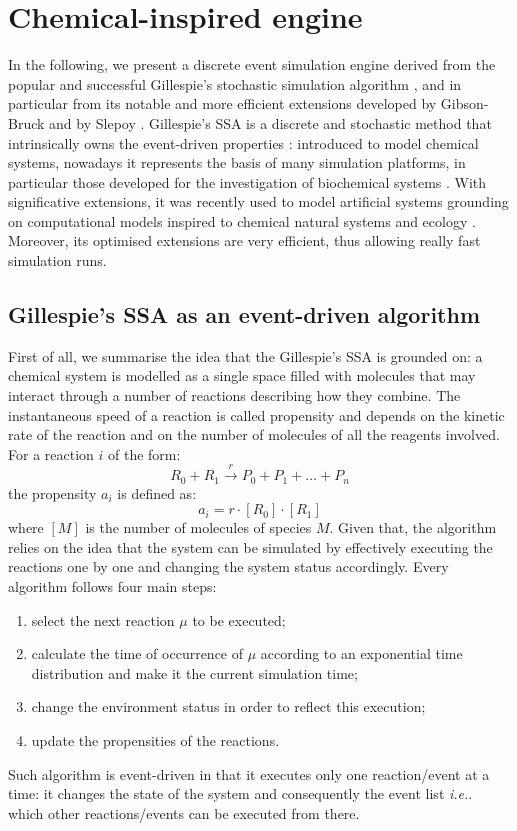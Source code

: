 \documentclass[12pt,a4paper,twoside,openright]{book}
\begin{document}
\chapter{Chemical-inspired engine}
\label{chemical-engine}
In the following, we present a discrete event simulation engine derived from the popular and successful Gillespie's stochastic simulation algorithm \cite{gillespie1977}, and in particular from its notable and more efficient extensions developed by Gibson-Bruck \cite{gibson2000} and by Slepoy \cite{slepoy2008}.   
%
Gillespie's SSA is a discrete and stochastic method that intrinsically owns the event-driven properties \cite{spatialeventgillespie}: introduced to model chemical systems, nowadays it represents the basis of many simulation platforms, in particular those developed for the investigation of biochemical systems \cite{Priami:2001,Kierzek01032002,CiocchettaH09,versari08,montagna-cs2bio10,btssoc-jos7,Hoops15122006}. 
%
With significative extensions, it was recently used to model artificial systems grounding on computational models inspired to chemical natural systems and ecology \cite{Montagna-MONET2012}.
%
Moreover, its optimised extensions \cite{gibson2000,slepoy2008} are very efficient, thus allowing really fast simulation runs.

\section{Gillespie's SSA as an event-driven algorithm}
First of all, we summarise the idea that the Gillespie's SSA is grounded on:
%
a chemical system is modelled as a single space filled with molecules that may interact through a number of reactions describing how they combine. 
%
The instantaneous speed of a reaction is called propensity and depends on the kinetic  rate of the reaction and on the number of molecules of all the reagents involved. 
%
For a reaction $i$ of the form:
$$ R_0 + R_1 \xrightarrow{r} P_0 + P_1 + \ldots + P_n$$
the propensity $a_i$ is defined as:
$$ a_i = r\cdot [R_0] \cdot [R_1] $$
where $[M]$ is the number of molecules of species $M$.
%
Given that, the algorithm relies on the idea that the system can be simulated by effectively executing the reactions one by one and changing the system status accordingly. 
%
Every algorithm follows four main steps:
%
\begin{enumerate}
	\item select the next reaction $\mu$ to be executed;
	\item calculate the time of occurrence of $\mu$ according to an exponential time distribution and make it the current simulation time;
	\item change the environment status in order to reflect this execution;
	\item update the propensities of the reactions.
\end{enumerate}
%
Such algorithm is event-driven in that it executes only one reaction/event at a time: it changes the state of the system and consequently the event list \emph{i.e.}. which other reactions/events can be executed from there.
\end{document}
